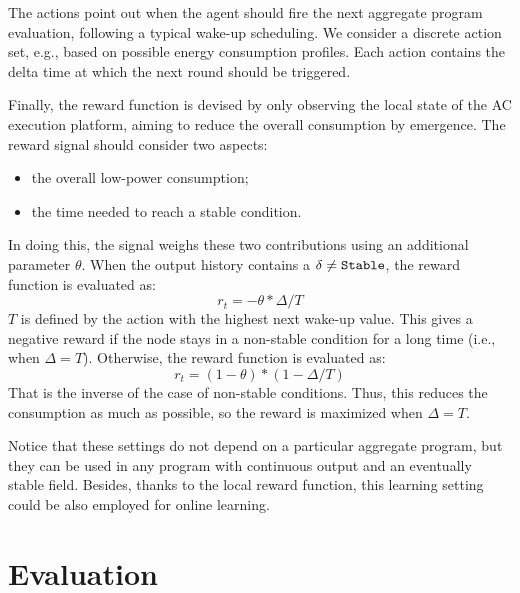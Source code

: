 The actions point out when the agent should fire the next aggregate program evaluation, following a typical wake-up scheduling.
%
We consider a discrete action set, e.g., based on possible energy consumption profiles.
% 
Each action contains the delta time at which the next round should be triggered. 

Finally, the reward function is devised by only observing the local state of the \ac{AC} execution platform, aiming to reduce the overall consumption by emergence.
%
The reward signal should consider two aspects: \begin{itemize}
    \item the overall low-power consumption;
    \item the time needed to reach a stable condition.
\end{itemize} 
In doing this, the signal weighs these two contributions using an additional parameter $\theta$.
 When the output history contains a $\delta \neq \text{\texttt{Stable}}$, the reward function is evaluated as:
\begin{equation}
r_t = - \theta * \Delta / T
\end{equation}
$T$ is defined by the action with the highest next wake-up value.
%
This gives a negative reward if the node stays in a non-stable condition for a long time (i.e., when $\Delta = T$).
Otherwise, the reward function is evaluated as:
\begin{equation}
r_t = (1 - \theta) * (1 - \Delta / T)
\end{equation}
That is the inverse of the case of non-stable conditions. 
 Thus, this reduces the consumption as much as possible, so the reward is maximized when $\Delta = T$.

Notice that these settings do not depend on a particular aggregate program, 
 but they can be used in any program with continuous output and an eventually stable field. 
%
Besides, thanks to the local reward function, 
 this learning setting could be also employed for online learning.

\newcommand{\rlsol}{{\sc{}Rl}}
\newcommand{\periodicsol}{{\sc{}Periodic}}
\newcommand{\adhocsol}{{\sc{}Ad-hoc}}
\newcommand{\swapscen}{{\sc{}Swap}}
\newcommand{\multiswap}{{\sc{}MultiSwap}}
\section{Evaluation}\label{acsos2022:sec:evaluation}


